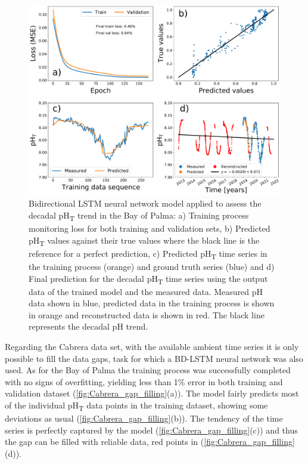 \begin{figure}[H]
    \centering
    \includegraphics[width=1\textwidth]{Figures/Best_bidirectional_LSTM.pdf}
    \caption{Bidirectional LSTM neural network model applied to assess the
        decadal pH\textsubscript{T} trend in the Bay of Palma: a) Training
        process
        monitoring loss for both training and validation sets, b) Predicted
        pH\textsubscript{T} values against their true values where the black
        line is
        the reference for a perfect prediction, c) Predicted
        pH\textsubscript{T} time
        series in the training process (orange) and ground truth series (blue)
        and d)
        Final prediction for the decadal pH\textsubscript{T} time series using
        the
        output data of the trained model and the measured data. Measured pH
        data shown
        in blue, predicted data in the training process is shown in orange and
        reconstructed data is shown in red. The black line represents the
        decadal pH
        trend.}
    \label{fig:best_LSTM}
\end{figure}

Regarding the Cabrera data set, with the available ambient time series it
is only possible to fill the data gaps, task for which a BD-LSTM neural network
was also used. As for the Bay of Palma the training process was successfully
completed with no signs of overfitting, yielding less than 1\% error in both
training and validation dataset (\cref{fig:Cabrera_gap_filling}(a)). The model
fairly predicts most of the individual pH\textsubscript{T} data points in the
training dataset, showing some deviations as usual
(\cref{fig:Cabrera_gap_filling}(b)). The tendency of the time series is
perfectly captured by the model (\cref{fig:Cabrera_gap_filling}(c)) and thus
the gap can be filled with reliable data, red points in
(\cref{fig:Cabrera_gap_filling}(d)).

